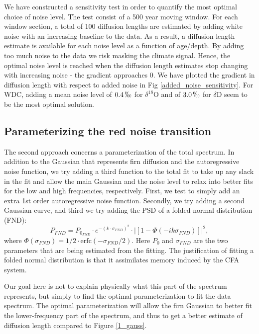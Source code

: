 \documentclass[draft, jgrga]{AGUTeX}
\begin{document}
\begin{article}
We have constructed a sensitivity test in order to quantify the most optimal choice of noise level.
The test consist of a 500 year moving window.
For each window section, a total of 100 diffusion lengths are estimated
by adding white noise with an increasing baseline to the data.
As a result, a diffusion length estimate is available for each noise level as a function of age/depth.
By adding too much noise to the data we risk masking the climate signal.
Hence, the optimal noise level is reached when the diffusion length estimates stop changing with increasing
noise - the gradient approaches 0.
We have plotted the gradient in diffusion length with respect to added noise in Fig \ref{added_noise_sensitivity}.
For WDC, adding a mean noise level of $0.4 \, \permil$ for $\delta^{18}$O  and of $3.0 \,\permil$ for $\delta$D seem
to be the most optimal solution.

\subsection{Parameterizing the red noise transition}
The second approach concerns a parameterization of the total spectrum.
In addition to the Gaussian that represents firn diffusion and the autoregressive noise function,
we try adding a third function to the total fit to take up any slack in the fit and allow
the main Gaussian and the noise level to relax into better fits for the low and high frequencies,
respectively.
First, we test to simply add an extra 1st order autoregressive noise function.
Secondly, we try adding a second Gaussian curve,
and third we try adding the PSD of a folded normal distribution (FND):
\begin{equation}
P_{FND} = P_{0_{FND}} \cdot e^{-(k \cdot \sigma_{FND})^2} \cdot |\left[1 - \Phi(-i k \sigma_{FND})\right]|^2,
\end{equation}
where $\Phi(\sigma_{FND}) = 1/2\cdot \mathrm{erfc}(-\sigma_{FND}/2) $. Here $P_0$ and $\sigma_{FND}$ are the
two parameters that are being estimated from the fitting.
The justification of fitting a folded normal distribution is that it assimilates memory induced by
the CFA system.

Our goal here is not to explain physically what this part of the spectrum represents,
but simply to find the optimal parameterization to fit the data spectrum.
The optimal parameterization will allow the firn Gaussian to better fit the lower-frequency part of the spectrum,
and thus to get a better estimate of diffusion length compared to Figure \ref{1_gauss}.



\end{article}
\end{document}
